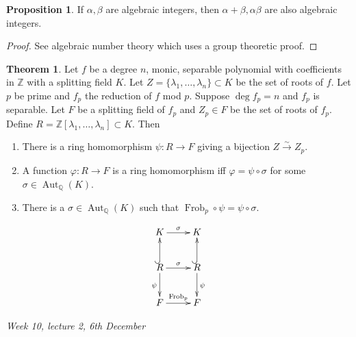 \documentclass{article}
\newcommand{\Z}{\mathbb{Z}}
\newcommand{\Q}{\mathbb{Q}}
\newcommand{\Aut}{\operatorname{Aut}}
\newcommand{\Frob}{\operatorname{Frob}}
\theoremstyle{definition}
\newtheorem{prop}[defn]{Proposition}
\newtheorem{thm}[defn]{Theorem}
\begin{document}
\begin{prop}
\label{prop:apbandatbareinZ}
If $\alpha,\beta$ are algebraic integers, then $\alpha+\beta,\alpha\beta$ are also algebraic integers.
\end{prop}
\begin{proof}
See algebraic number theory which uses a group theoretic proof.
\end{proof}

\begin{thm}
Let $f$ be a degree $n$, monic, separable polynomial  with coefficients in $\Z$ with a splitting field $K$. Let $Z=\{\lambda_1,\ldots,\lambda_n\}\subset K$ be the set of roots of $f$. Let $p$ be prime and $f_p$ the reduction of $f$ mod $p$. Suppose $\deg f_p=n$ and $f_p$ is separable. Let $F$ be a splitting field of $f_p$ and $Z_p\in F$ be the set of roots of $f_p$. Define $R=\Z[\lambda_1,\ldots,\lambda_n]\subset K$. Then

\begin{minipage}{0.78\textwidth}
\begin{enumerate}
\item There is a ring homomorphism $\psi:R\rightarrow F$ giving a bijection $Z\xrightarrow{\sim} Z_p$.
\item A function $\varphi:R\rightarrow F$ is a ring homomorphism iff $\varphi=\psi\circ\sigma$ for some $\sigma\in\Aut_\Q(K)$.
\item There is a $\sigma\in\Aut_\Q(K)$ such that $\Frob_p\circ\psi=\psi\circ\sigma$.
\end{enumerate}
\end{minipage}
\begin{minipage}{0.22\textwidth}
\[
\xymatrix{
K\ar[r]^\sigma & K \\
R\ar[r]^\sigma \ar@{^{(}->}[u] \ar[d]_\psi & R \ar@{^{(}->}[u] \ar[d]^\psi \\
F\ar[r]^{\Frob_p} & F
}
\]
\end{minipage}
\end{thm}

\begin{flushright}
\textit{Week 10, lecture 2, 6th December}
\end{flushright}
\end{document}
